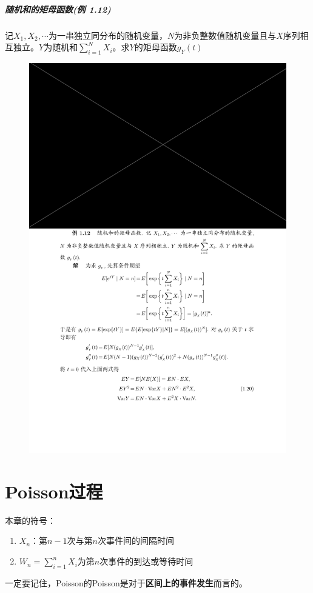 \documentclass[]{report}
\begin{document}
		\paragraph{随机和的矩母函数(例 1.12)} 记$X_1,X_2,\cdots$为一串独立同分布的随机变量，$N$为非负整数值随机变量且与$X$序列相互独立。$Y$为随机和$\displaystyle\sum_{i=1}^NX_i$。求$Y$的矩母函数$g_Y(t)$
		\begin{figure}[h!]
			\centering
			\begin{minipage}{40em}
				\centering
				\includegraphics[scale = 0.9]{images/随机和的矩母函数.pdf}
			\end{minipage}
		\end{figure}

	\chapter{Poisson过程}
	本章的符号：
	\begin{enumerate}
		\item $X_n$：第$n-1$次与第$n$次事件间的间隔时间
		\item $W_n=\displaystyle\sum_{i=1}^nX_i$为第$n$次事件的到达或等待时间
	\end{enumerate}\par
	一定要记住，Poisson的Poisson是对于\textbf{区间上的事件发生}而言的。
\end{document}
